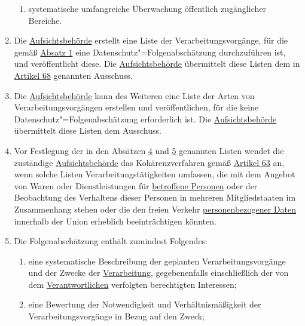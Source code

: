 \begin{enumerate}
\begin{enumerate}
    \item systematische umfangreiche Überwachung öffentlich zugänglicher Bereiche.%
    \label{itm:35-3c}

  \end{enumerate}

  \item Die \hyperref[itm:04-21]{Aufsichtsbehörde} erstellt eine Liste der Verarbeitungsvorgänge, für die
   gemäß \hyperref[itm:35-1]{Absatz 1} eine Datenschutz"=Folgenabschätzung durchzuführen ist, und veröffentlicht diese.
   Die \hyperref[itm:04-21]{Aufsichtsbehörde} übermittelt diese Listen dem in \hyperref[ch:68]{Artikel 68} genannten
   Ausschuss.%
  \label{itm:35-4}

  \item Die \hyperref[itm:04-21]{Aufsichtsbehörde} kann des Weiteren eine Liste der Arten von Verarbeitungsvorgängen
   erstellen und veröffentlichen, für die keine Datenschutz"=Folgenabschätzung erforderlich ist. Die \hyperref
   [itm:04-21]{Aufsichtsbehörde} übermittelt diese Listen dem Ausschuss.%
  \label{itm:35-5}

  \item Vor Festlegung der in den Absätzen \hyperref[itm:35-4]{4} und \hyperref[itm:35-5]{5} genannten Listen wendet die
   zuständige \hyperref[itm:04-21]{Aufsichtsbehörde} das Kohärenzverfahren gemäß \hyperref[ch:63]{Artikel 63} an, wenn
   solche Listen Verarbeitungstätigkeiten umfassen, die mit dem Angebot von Waren oder Dienstleistungen für \hyperref
   [itm:04-1]{betroffene Personen} oder der Beobachtung des Verhaltens dieser Personen in mehreren Mitgliedstaaten im
   Zusammenhang stehen oder die den freien Verkehr \hyperref[itm:04-1]{personenbezogener Daten} innerhalb der Union
   erheblich beeinträchtigen könnten.%
  \label{itm:35-6}

  \item Die Folgenabschätzung enthält zumindest Folgendes:%
  \label{itm:35-7}

  \begin{enumerate}
  
    \item eine systematische Beschreibung der geplanten Verarbeitungsvorgänge und der Zwecke der \hyperref[itm:04-2]
     {Verarbeitung}, gegebenenfalls einschließlich der von dem \hyperref[itm:04-7]{Verantwortlichen} verfolgten
     berechtigten Interessen;%
    \label{itm:35-7a}

    \item eine Bewertung der Notwendigkeit und Verhältnismäßigkeit der Verarbeitungsvorgänge in Bezug auf den Zweck;%
    \label{itm:35-7b}


\end{enumerate}
\end{enumerate}
